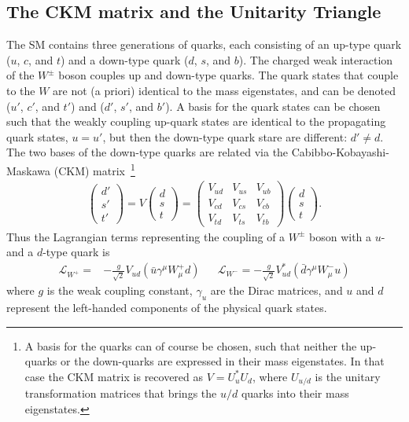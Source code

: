 \subsection{The CKM matrix and the Unitarity Triangle} %
\label{sub:the_ckm_matrix}

The SM contains three generations of quarks, each consisting of an up-type quark ($u$, $c$, and $t$) and a down-type quark ($d$, $s$, and $b$). The charged weak interaction of the $W^\pm$ boson couples up and down-type quarks. The quark states that couple to the $W$ are not (a priori) identical to the mass eigenstates, and can be denoted ($u'$, $c'$, and $t'$) and ($d'$, $s'$, and $b'$). A basis for the quark states can be chosen such that the weakly coupling up-quark states are identical to the propagating quark states, $u=u'$, but then the down-type quark stare are different: $d'\neq d$. The two bases of the down-type quarks are related via the Cabibbo-Kobayashi-Maskawa (CKM) matrix~\cite{kobayashiCPViolationRenormalizableTheory1973,cabibboUnitarySymmetryLeptonic1963}\footnote{
    A basis for the quarks can of course be chosen, such that neither the up-quarks or the down-quarks are expressed in their mass eigenstates. In that case the CKM matrix is recovered as $V=U^*_u U_d$, where $U_{u/d}$ is the unitary transformation matrices that brings the $u/d$ quarks into their mass eigenstates.
}
\begin{align}
    \begin{pmatrix}
        d' \\ s' \\ t'
    \end{pmatrix}
    = V \begin{pmatrix}
            d \\ s \\ t
    \end{pmatrix} 
    =
    \begin{pmatrix}
        V_{ud} & V_{us} & V_{ub} \\
        V_{cd} & V_{cs} & V_{cb} \\
        V_{td} & V_{ts} & V_{tb} 
    \end{pmatrix}
    \begin{pmatrix}
            d \\ s \\ t
    \end{pmatrix}.
\end{align}
Thus the Lagrangian terms representing the coupling of a $W^\pm$ boson with a $u$- and a $d$-type quark is
\begin{align}\label{eq:W_coupling}
   \mathcal L_{W^+}= &-\frac{g}{\sqrt{2}}V_{ud} \left(\bar u \gamma^\mu W_\mu^+ d \right)&& \mathcal L_{W^-}=-\frac{g}{\sqrt{2}} V_{ud}^* \left( \bar d \gamma^\mu W_\mu^- u\right)
\end{align}
where $g$ is the weak coupling constant, $\gamma_u$ are the Dirac matrices, and $u$ and $d$ represent the left-handed components of the physical quark states.

